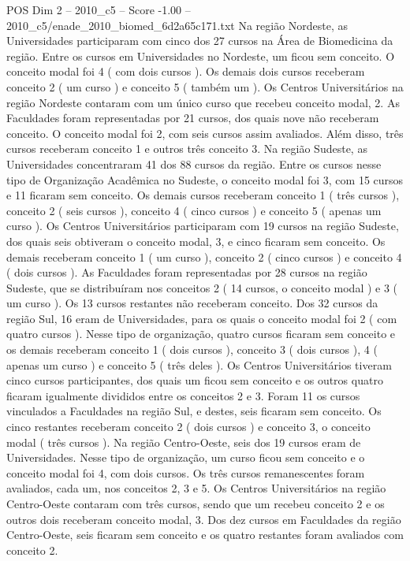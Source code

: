 \begin{textsample}{POS Dim 2 – 2010\_c5 – Score -1.00 – 2010\_c5/enade\_2010\_biomed\_6d2a65c171.txt}
Na região Nordeste, as Universidades participaram com cinco dos 27 cursos na Área de Biomedicina da região.
Entre os cursos em Universidades no Nordeste, um ficou sem conceito.
O conceito modal foi 4 ( com dois cursos ).
Os demais dois cursos receberam conceito 2 ( um curso ) e conceito 5 ( também um ).
Os Centros Universitários na região Nordeste contaram com um único curso que recebeu conceito modal, 2.
As Faculdades foram representadas por 21 cursos, dos quais nove não receberam conceito.
O conceito modal foi 2, com seis cursos assim avaliados.
Além disso, três cursos receberam conceito 1 e outros três conceito 3.
Na região Sudeste, as Universidades concentraram 41 dos 88 cursos da região.
Entre os cursos nesse tipo de Organização Acadêmica no Sudeste, o conceito modal foi 3, com 15 cursos e 11 ficaram sem conceito.
Os demais cursos receberam conceito 1 ( três cursos ), conceito 2 ( seis cursos ), conceito 4 ( cinco cursos ) e conceito 5 ( apenas um curso ).
Os Centros Universitários participaram com 19 cursos na região Sudeste, dos quais seis obtiveram o conceito modal, 3, e cinco ficaram sem conceito.
Os demais receberam conceito 1 ( um curso ), conceito 2 ( cinco cursos ) e conceito 4 ( dois cursos ).
As Faculdades foram representadas por 28 cursos na região Sudeste, que se distribuíram nos conceitos 2 ( 14 cursos, o conceito modal ) e 3 ( um curso ).
Os 13 cursos restantes não receberam conceito.
Dos 32 cursos da região Sul, 16 eram de Universidades, para os quais o conceito modal foi 2 ( com quatro cursos ).
Nesse tipo de organização, quatro cursos ficaram sem conceito e os demais receberam conceito 1 ( dois cursos ), conceito 3 ( dois cursos ), 4 ( apenas um curso ) e conceito 5 ( três deles ).
Os Centros Universitários tiveram cinco cursos participantes, dos quais um ficou sem conceito e os outros quatro ficaram igualmente divididos entre os conceitos 2 e 3.
Foram 11 os cursos vinculados a Faculdades na região Sul, e destes, seis ficaram sem conceito.
Os cinco restantes receberam conceito 2 ( dois cursos ) e conceito 3, o conceito modal ( três cursos ).
Na região Centro-Oeste, seis dos 19 cursos eram de Universidades.
Nesse tipo de organização, um curso ficou sem conceito e o conceito modal foi 4, com dois cursos.
Os três cursos remanescentes foram avaliados, cada um, nos conceitos 2, 3 e 5.
Os Centros Universitários na região Centro-Oeste contaram com três cursos, sendo que um recebeu conceito 2 e os outros dois receberam conceito modal, 3.
Dos dez cursos em Faculdades da região Centro-Oeste, seis ficaram sem conceito e os quatro restantes foram avaliados com conceito 2.

\end{textsample}

